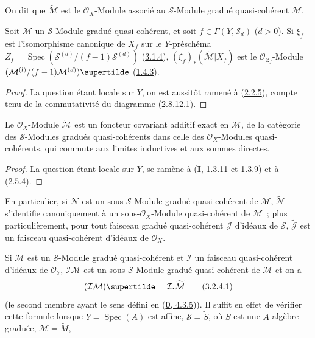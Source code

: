 On dit que $\widetilde{\mathcal{M}}$ est le $\mathcal{O}_X$-Module associé au
$\mathcal{S}$-Module gradué quasi-cohérent $\mathcal{M}$.

\begin{proposition}[3.2.3]
\label{II.3.2.3-fr}
Soit $\mathcal{M}$ un $\mathcal{S}$-Module gradué quasi-cohérent, et soit
$f\in\Gamma(Y,\mathcal{S}_d)$ ($d>0$). Si $\xi_f$ est l'isomorphisme canonique
de $X_f$ sur le $Y$-préschéma
$Z_f=\operatorname{Spec}(\mathcal{S}^{(d)}/(f-1)\mathcal{S}^{(d)})$
\textup{(\hyperref[II.3.1.4-fr]{3.1.4})}, $(\xi_f)_*(\widetilde{\mathcal{M}}|X_f)$ est
le $\mathcal{O}_{Z_f}$-Module
$(\mathcal{M}^{(l)}/(f-1)\mathcal{M}^{(d)})\supertilde$
\textup{(\hyperref[II.1.4.3-fr]{1.4.3})}.
\end{proposition}

\begin{proof}
La question étant locale sur $Y$, on est aussitôt ramené à
(\hyperref[II.2.2.5-fr]{2.2.5}), compte tenu de la commutativité du diagramme
(\hyperref[II.2.8.12.1-fr]{2.8.12.1}).
\end{proof}

\begin{proposition}[3.2.4]
\label{II.3.2.4-fr}
Le $\mathcal{O}_X$-Module $\widetilde{\mathcal{M}}$ est un foncteur covariant
additif exact en $\mathcal{M}$, de la catégorie des $\mathcal{S}$-Modules
gradués quasi-cohérents dans celle des $\mathcal{O}_X$-Modules
quasi-cohérents, qui commute aux limites inductives et aux sommes directes.
\end{proposition}

\begin{proof}
La question étant locale sur $Y$, se ramène à
(\hyperref[I.1.3.11-fr]{\textbf{I}, 1.3.11} et
\hyperref[I.1.3.9-fr]{1.3.9}) et à
(\hyperref[II.2.5.4-fr]{2.5.4}).
\end{proof}

En particulier, si $\mathcal{N}$ est un sous-$\mathcal{S}$-Module gradué
quasi-cohérent de $\mathcal{M}$, $\widetilde{\mathcal{N}}$ s'identifie
canoniquement à un sous-$\mathcal{O}_X$-Module quasi-cohérent de
$\widetilde{\mathcal{M}}$~; plus particulièrement, pour tout faisceau gradué
quasi-cohérent $\mathcal{J}$ d'idéaux de $\mathcal{S}$,
$\widetilde{\mathcal{J}}$ est un faisceau quasi-cohérent d'idéaux de
$\mathcal{O}_X$.

Si $\mathcal{M}$ est un $\mathcal{S}$-Module gradué quasi-cohérent et
$\mathcal{I}$ un faisceau quasi-cohérent d'idéaux de $\mathcal{O}_Y$,
$\mathcal{I}\mathcal{M}$ est un sous-$\mathcal{S}$-Module gradué
quasi-cohérent de $\mathcal{M}$ et on a
\[
\label{II.3.2.4.1-fr}
  (\mathcal{I}\mathcal{M})\supertilde
  =\mathcal{I}.\widetilde{\mathcal{M}}
\tag{3.2.4.1}
\]
(le second membre ayant le sens défini en
(\hyperref[0.4.3.5-fr]{\textbf{0}, 4.3.5})). Il suffit en effet de vérifier cette
formule lorsque $Y=\operatorname{Spec}(A)$ est affine,
$\mathcal{S}=\widetilde{S}$, où $S$ est une $A$-algèbre graduée,
$\mathcal{M}=\widetilde{M}$,
